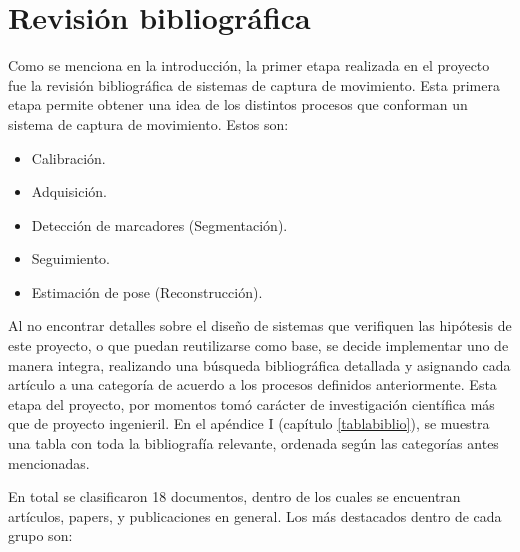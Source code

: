 \section{Revisión bibliográfica}
\label{invBiblio}

Como se menciona en la introducción, la primer etapa realizada en el proyecto fue la revisión bibliográfica de sistemas de captura de movimiento. Esta primera etapa permite obtener una idea de los distintos procesos que conforman un sistema de captura de movimiento. Estos son:

\begin{itemize}
	\item Calibración.
	\item Adquisición.
	\item Detección de marcadores (Segmentación).
	\item Seguimiento.
	\item Estimación de pose (Reconstrucción).
\end{itemize}

Al no encontrar detalles sobre el diseño de sistemas que verifiquen las hipótesis de este proyecto, o que puedan reutilizarse como base, se decide implementar uno de manera integra, realizando una búsqueda bibliográfica detallada y asignando cada artículo a una categoría de acuerdo a los procesos definidos anteriormente. Esta etapa del proyecto, por momentos tomó carácter de investigación científica más que de proyecto ingenieril. 
En el apéndice I (capítulo \ref{tablabiblio}), se muestra una tabla con toda la bibliografía relevante, ordenada según las categorías antes mencionadas.


En total se clasificaron 18 documentos, dentro de los cuales se encuentran artículos, papers, y publicaciones en general. Los más destacados dentro de cada grupo son:

